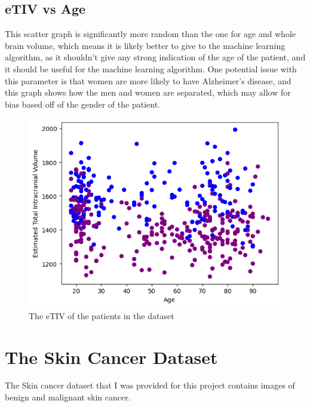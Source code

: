 \documentclass[]{final_report}
\begin{document}
\clearpage
\subsection{eTIV vs Age}
This scatter graph is significantly more random than the one for age and whole brain volume, which means it is likely better to give to the machine learning algorithm, as it shouldn't give any strong indication of the age of the patient, and it should be useful for the machine learning algorithm.
One potential issue with this parameter is that women are more likely to have Alzheimer's disease, and this graph shows how the men and women are separated, which may allow for bias based off of the gender of the patient.
\begin{figure}[h]
  \centering
  \includegraphics[width=1\textwidth]{images/eTIV-vs-Age.png}
  \caption{The eTIV of the patients in the dataset}
  \label{fig:eTIV-vs-Age}
\end{figure}

\clearpage

\section{The Skin Cancer Dataset}
The Skin cancer dataset\cite{TAN2019105725} that I was provided for this project contains images of benign and malignant skin cancer.
\end{document}
